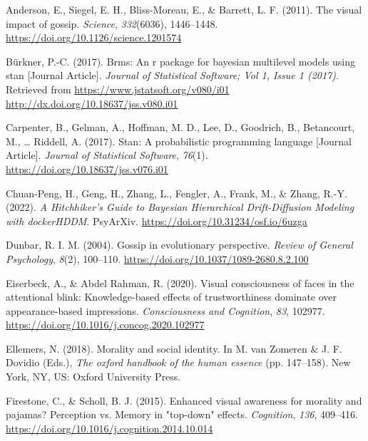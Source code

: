 \documentclass[
  man]{apa6}
\newlength{\cslhangindent}
\newlength{\cslentryspacingunit} %
\newenvironment{CSLReferences}[2] %
 {%
  \setlength{\parindent}{0pt}
  \ifodd #1
  \let\oldpar\par
  \def\par{\hangindent=\cslhangindent\oldpar}
  \fi
  \setlength{\parskip}{#2\cslentryspacingunit}
 }%
 {}
\begin{document}
\hypertarget{refs}{}
\begin{CSLReferences}{1}{0}
\leavevmode{}%
Anderson, E., Siegel, E. H., Bliss-Moreau, E., \& Barrett, L. F. (2011). The visual impact of gossip. \emph{Science}, \emph{332}(6036), 1446--1448. \url{https://doi.org/10.1126/science.1201574}

\leavevmode{}%
Bürkner, P.-C. (2017). Brms: An r package for bayesian multilevel models using stan {[}Journal Article{]}. \emph{Journal of Statistical Software; Vol 1, Issue 1 (2017)}. Retrieved from \href{https://www.jstatsoft.org/v080/i01\%0Ahttp://dx.doi.org/10.18637/jss.v080.i01}{https://www.jstatsoft.org/v080/i01
http://dx.doi.org/10.18637/jss.v080.i01}

\leavevmode{}%
Carpenter, B., Gelman, A., Hoffman, M. D., Lee, D., Goodrich, B., Betancourt, M., \ldots{} Riddell, A. (2017). Stan: A probabilistic programming language {[}Journal Article{]}. \emph{Journal of Statistical Software}, \emph{76}(1). \url{https://doi.org/10.18637/jss.v076.i01}

\leavevmode{}%
Chuan-Peng, H., Geng, H., Zhang, L., Fengler, A., Frank, M., \& Zhang, R.-Y. (2022). \emph{A {Hitchhiker}'s {Guide} to {Bayesian} {Hierarchical} {Drift}-{Diffusion} {Modeling} with {dockerHDDM}}. PsyArXiv. \url{https://doi.org/10.31234/osf.io/6uzga}

\leavevmode{}%
Dunbar, R. I. M. (2004). Gossip in evolutionary perspective. \emph{Review of General Psychology}, \emph{8}(2), 100--110. \url{https://doi.org/10.1037/1089-2680.8.2.100}

\leavevmode{}%
Eiserbeck, A., \& Abdel Rahman, R. (2020). Visual consciousness of faces in the attentional blink: Knowledge-based effects of trustworthiness dominate over appearance-based impressions. \emph{Consciousness and Cognition}, \emph{83}, 102977. \url{https://doi.org/10.1016/j.concog.2020.102977}

\leavevmode{}%
Ellemers, N. (2018). Morality and social identity. In M. van Zomeren \& J. F. Dovidio (Eds.), \emph{The oxford handbook of the human essence} (pp. 147--158). New York, {NY}, {US}: Oxford University Press.

\leavevmode{}%
Firestone, C., \& Scholl, B. J. (2015). Enhanced visual awareness for morality and pajamas? Perception vs. Memory in "top-down" effects. \emph{Cognition}, \emph{136}, 409--416. \url{https://doi.org/10.1016/j.cognition.2014.10.014}


\end{CSLReferences}
\end{document}
